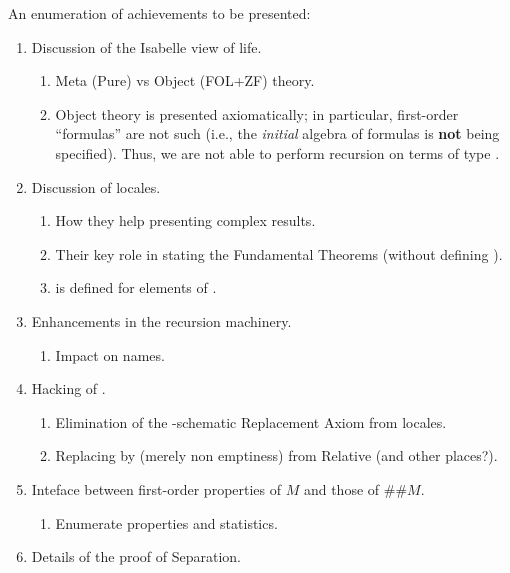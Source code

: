 An enumeration of achievements to be presented:
\begin{enumerate}
\item Discussion of the Isabelle view of life.
  \begin{enumerate}
  \item Meta (Pure) vs Object (FOL+ZF) theory.
  \item Object theory is presented axiomatically; in particular,
    first-order ``formulas'' are not such (i.e., the \emph{initial}
    algebra of formulas is \textbf{not} being specified). Thus, we are
    not able to perform recursion on terms of type \tyo.
  \end{enumerate}
\item Discussion of locales.
  \begin{enumerate}
  \item How they help presenting complex results.
  \item Their key role in stating the Fundamental Theorems (without
    defining ).
  \item {} is defined for elements of \formula.
  \end{enumerate}
\item Enhancements in the recursion machinery.
  \begin{enumerate}
  \item Impact on names.
  \end{enumerate}
\item Hacking of .
  \begin{enumerate}
  \item Elimination of the \tyo-schematic Replacement Axiom from
    locales.
  \item Replacing  by  (merely non
    emptiness) from Relative (and other places?).
  \end{enumerate}
\item Inteface between first-order properties of $M$ and those of
  $\#\#M$.
  \begin{enumerate}
  \item Enumerate properties and statistics.
  \end{enumerate}
\item Details of the proof of Separation.
\end{enumerate}

